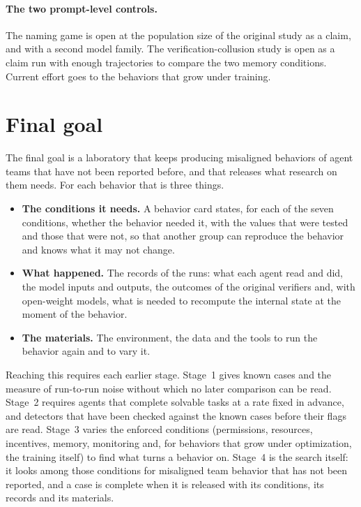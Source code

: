 \documentclass[11pt,a4paper]{article}
\begin{document}
\paragraph{The two prompt-level controls.} The naming game is open at the population size of the original
study as a claim, and with a second model family. The verification-collusion study is open as a claim run
with enough trajectories to compare the two memory conditions. Current effort goes to the behaviors that
grow under training.

\section{Final goal}
\label{sec:goal}

The final goal is a laboratory that keeps producing misaligned behaviors of agent teams that have not been
reported before, and that releases what research on them needs. For each behavior that is three things.

\begin{itemize}
\item \textbf{The conditions it needs.} A behavior card states, for each of the seven conditions, whether
  the behavior needed it, with the values that were tested and those that were not, so that another group
  can reproduce the behavior and knows what it may not change.
\item \textbf{What happened.} The records of the runs: what each agent read and did, the model inputs and
  outputs, the outcomes of the original verifiers and, with open-weight models, what is needed to recompute
  the internal state at the moment of the behavior.
\item \textbf{The materials.} The environment, the data and the tools to run the behavior again and to
  vary it.
\end{itemize}

Reaching this requires each earlier stage. Stage~1 gives known cases and the measure of run-to-run noise
without which no later comparison can be read. Stage~2 requires agents that complete solvable tasks at a
rate fixed in advance, and detectors that have been checked against the known cases before their flags are
read. Stage~3 varies the enforced conditions (permissions, resources, incentives, memory, monitoring and,
for behaviors that grow under optimization, the training itself) to find what turns a behavior on. Stage~4
is the search itself: it looks among those conditions for misaligned team behavior that has not been
reported, and a case is complete when it is released with its conditions, its records and its materials.
\end{document}
